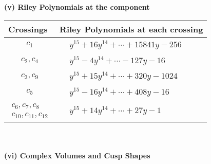 \documentclass[1p]{elsarticle_modified}
\theoremstyle{definition}
\begin{document}
\newpage\renewcommand{\arraystretch}{1}
\flushleft \textbf{(v) Riley Polynomials at the component}\newline \\
\begin{tabular}{m{50pt}|m{274pt}}
Crossings & \hspace{64pt}Riley Polynomials at each crossing \\
\hline $$\begin{aligned}c_{1}\end{aligned}$$&$\begin{aligned}
&y^{15}+16 y^{14}+\cdots+15841 y-256
\end{aligned}$\\
\hline $$\begin{aligned}c_{2},c_{4}\end{aligned}$$&$\begin{aligned}
&y^{15}-4 y^{14}+\cdots-127 y-16
\end{aligned}$\\
\hline $$\begin{aligned}c_{3},c_{9}\end{aligned}$$&$\begin{aligned}
&y^{15}+15 y^{14}+\cdots+320 y-1024
\end{aligned}$\\
\hline $$\begin{aligned}c_{5}\end{aligned}$$&$\begin{aligned}
&y^{15}-16 y^{14}+\cdots+408 y-16
\end{aligned}$\\
\hline $$\begin{aligned}c_{6},c_{7},c_{8}\\c_{10},c_{11},c_{12}\end{aligned}$$&$\begin{aligned}
&y^{15}+14 y^{14}+\cdots+27 y-1
\end{aligned}$\\
\hline
\end{tabular}\\~\\
\newpage\flushleft \textbf{(vi) Complex Volumes and Cusp Shapes}
\end{document}
